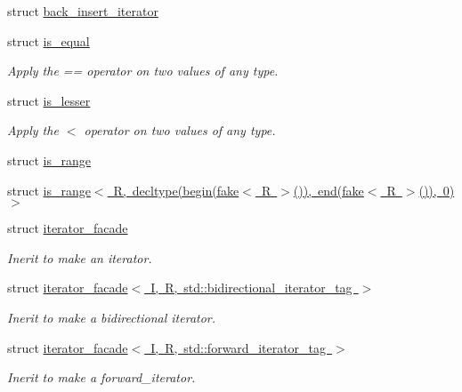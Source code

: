 \begin{DoxyCompactItemize}
\item 
struct \mbox{\hyperlink{structrah_1_1back__insert__iterator}{back\+\_\+insert\+\_\+iterator}}
\item 
struct \mbox{\hyperlink{structrah_1_1is__equal}{is\+\_\+equal}}
\begin{DoxyCompactList}\small\item\em Apply the \textquotesingle{}==\textquotesingle{} operator on two values of any type. \end{DoxyCompactList}\item 
struct \mbox{\hyperlink{structrah_1_1is__lesser}{is\+\_\+lesser}}
\begin{DoxyCompactList}\small\item\em Apply the \textquotesingle{}$<$\textquotesingle{} operator on two values of any type. \end{DoxyCompactList}\item 
struct \mbox{\hyperlink{structrah_1_1is__range}{is\+\_\+range}}
\item 
struct \mbox{\hyperlink{structrah_1_1is__range_3_01_r_00_01decltype_07begin_07fake_3_01_r_01_4_07_08_08_00_01end_07fake_cf1a9a1e2579209cb82001bc9eda23c1}{is\+\_\+range$<$ R, decltype(begin(fake$<$ R $>$()), end(fake$<$ R $>$()), 0)$>$}}
\item 
struct \mbox{\hyperlink{structrah_1_1iterator__facade}{iterator\+\_\+facade}}
\begin{DoxyCompactList}\small\item\em Inerit to make an iterator. \end{DoxyCompactList}\item 
struct \mbox{\hyperlink{structrah_1_1iterator__facade_3_01_i_00_01_r_00_01std_1_1bidirectional__iterator__tag_01_4}{iterator\+\_\+facade$<$ I, R, std\+::bidirectional\+\_\+iterator\+\_\+tag $>$}}
\begin{DoxyCompactList}\small\item\em Inerit to make a bidirectional iterator. \end{DoxyCompactList}\item 
struct \mbox{\hyperlink{structrah_1_1iterator__facade_3_01_i_00_01_r_00_01std_1_1forward__iterator__tag_01_4}{iterator\+\_\+facade$<$ I, R, std\+::forward\+\_\+iterator\+\_\+tag $>$}}
\begin{DoxyCompactList}\small\item\em Inerit to make a forward\+\_\+iterator. \end{DoxyCompactList}\item 

\end{DoxyCompactItemize}
